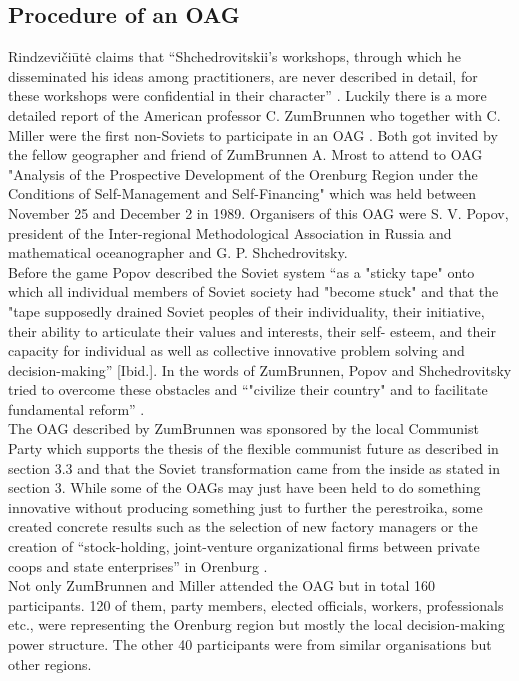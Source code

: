 \documentclass[11pt,a4paper]{article}
\begin{document}
\subsection{Procedure of an OAG}
Rindzevičiūtė claims that “Shchedrovitskii’s workshops, through which he disseminated his ideas among practitioners, are never described in detail, for these workshops were confidential in their character” \cite[p. 4]{Rindzeviit2015}. Luckily there is a more detailed report of the American professor C. ZumBrunnen who together with C. Miller were the first non-Soviets to participate in an OAG \cite[p. 1]{Brunnen}. Both got invited by the fellow geographer and friend of ZumBrunnen A. Mrost to attend to OAG "Analysis of the Prospective Development of the Orenburg Region under the Conditions of Self-Management and Self-Financing" which was held between November 25 and December 2 in 1989. Organisers of this OAG were S. V. Popov, president of the Inter-regional Methodological Association in Russia and mathematical oceanographer and G. P. Shchedrovitsky. \\
Before the game Popov described the Soviet system “as a "sticky tape" onto which all individual members of Soviet society had "become stuck" \cite[p. 3]{Brunnen} and that the "tape supposedly drained Soviet peoples of their individuality, their initiative, their ability to articulate their values and interests, their self- esteem, and their capacity for individual as well as collective innovative problem solving and decision-making” [Ibid.]. In the words of ZumBrunnen, Popov and Shchedrovitsky tried to overcome these obstacles and “"civilize their country" and to facilitate fundamental reform” \linebreak \cite[p. 2]{Brunnen}. \\
The OAG described by ZumBrunnen was sponsored by the local Communist Party which supports the thesis of the flexible communist future as described in section 3.3 and that the Soviet transformation came from the inside as stated in section 3. While some of the OAGs may just have been held to do something innovative without producing something just to further the perestroika, some created concrete results such as the selection of new factory managers or the creation of “stock-holding, joint-venture organizational firms between private coops and state enterprises” in Orenburg \linebreak \cite[p. 4]{Brunnen}. \\
Not only ZumBrunnen and Miller attended the OAG but in total 160 participants. 120 of them, party members, elected officials, workers, professionals etc., were representing the Orenburg region but mostly the local decision-making power structure. The other 40 participants were from similar organisations but other regions. \\
\end{document}

